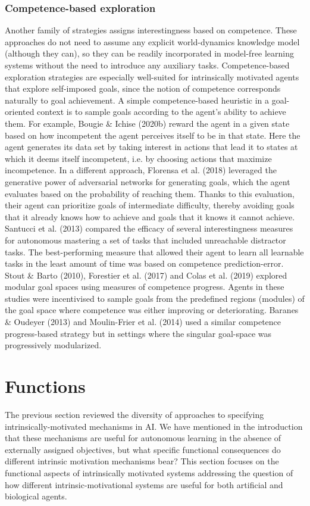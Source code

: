 \subsubsection{Competence-based exploration}
Another family of strategies assigns interestingness based on competence. These approaches do not need to assume any explicit world-dynamics knowledge model (although they can), so they can be readily incorporated in model-free learning systems without the need to introduce any auxiliary tasks. Competence-based exploration strategies are especially well-suited for intrinsically motivated agents that explore self-imposed goals, since the notion of competence corresponds naturally to goal achievement. A simple competence-based heuristic in a goal-oriented context is to sample goals according to the agent’s ability to achieve them. For example, Bougie \& Ichise (2020b) reward the agent in a given state based on how incompetent the agent perceives itself to be in that state. Here the agent generates its data set by taking interest in actions that lead it to states at which it deems itself incompetent, i.e. by choosing actions that maximize incompetence. In a different approach, Florensa et al. (2018) leveraged the generative power of adversarial networks for generating goals, which the agent evaluates based on the probability of reaching them. Thanks to this evaluation, their agent can prioritize goals of intermediate difficulty, thereby avoiding goals that it already knows how to achieve and goals that it knows it cannot achieve. Santucci et al. (2013) compared the efficacy of several interestingness measures for autonomous mastering a set of tasks that included unreachable distractor tasks. The best-performing measure that allowed their agent to learn all learnable tasks in the least amount of time was based on competence prediction-error. Stout \& Barto (2010), Forestier et al. (2017) and Colas et al. (2019) explored modular goal spaces using measures of competence progress. Agents in these studies were incentivised to sample goals from the predefined regions (modules) of the goal space where competence was either improving or deteriorating. Baranes \& Oudeyer (2013) and Moulin-Frier et al. (2014) used a similar competence progress-based strategy but in settings where the singular goal-space was progressively modularized.

\section{Functions}
The previous section reviewed the diversity of approaches to specifying intrinsically-motivated mechanisms in AI.  We have mentioned in the introduction that these mechanisms are useful for autonomous learning in the absence of externally assigned objectives, but what specific functional consequences do different intrinsic motivation mechanisms bear?  This section focuses on the functional aspects of intrinsically motivated systems addressing the question of how different intrinsic-motivational systems are useful for both artificial and biological agents.  


